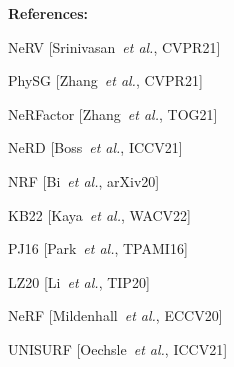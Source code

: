 \documentclass[landscape,a0paper,fontscale=0.292]{baposter}
\begin{document}
\begin{poster}
{\begin{minipage}[t]{0.49\textwidth}
        \vspace{-1em}
        \textbf{\color{ctitle}References:} \\
        \begin{minipage}[t]{0.25\textwidth}
            \vspace{-0.5em}
            \begin{enumerate}[label={[\arabic*]}, leftmargin=*]
                \scriptsize
                \item NeRV [Srinivasan~\emph{et al.}, CVPR21]
                \item PhySG [Zhang~\emph{et al.}, CVPR21]
            \end{enumerate}
        \end{minipage}\hfill
        \begin{minipage}[t]{0.36\textwidth}
            \vspace{-0.5em}
            \begin{enumerate}[label={[\arabic*]}, leftmargin=*]
                \scriptsize
                \setcounter{enumi}{2}
                \item NeRFactor [Zhang~\emph{et al.}, TOG21]
                \item NeRD [Boss~\emph{et al.}, ICCV21]
                \item NRF [Bi~\emph{et al.}, arXiv20]
                \item KB22 [Kaya~\emph{et al.}, WACV22]
            \end{enumerate}
        \end{minipage}\hfill
        \begin{minipage}[t]{0.38\textwidth}
            \vspace{-0.5em}
            \begin{enumerate}[label={[\arabic*]}, leftmargin=*]
                \scriptsize
                \setcounter{enumi}{6}
                \item PJ16 [Park~\emph{et al.}, TPAMI16]
                \item LZ20 [Li~\emph{et al.}, TIP20]
                \item NeRF [Mildenhall~\emph{et al.}, ECCV20]
                \item UNISURF [Oechsle~\emph{et al.}, ICCV21]
            \end{enumerate}
        \end{minipage}
    \end{minipage}

}
\end{poster}
\end{document}
